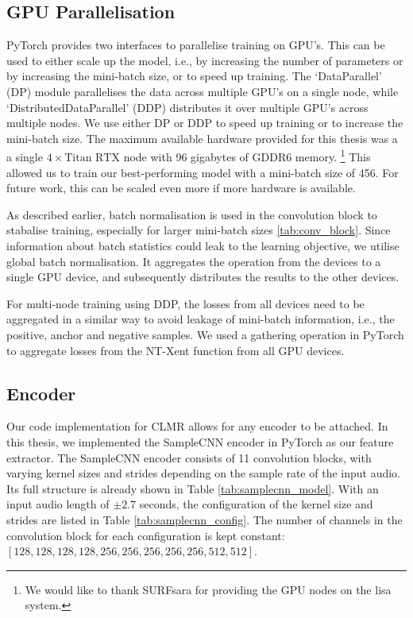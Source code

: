 \subsection{GPU Parallelisation}
PyTorch provides two interfaces to parallelise training on GPU's.
This can be used to either scale up the model, i.e., by increasing the number of parameters or by increasing the mini-batch size, or to speed up training.
The `DataParallel' (DP) module parallelises the data across multiple GPU's on a single node, while `DistributedDataParallel' (DDP) distributes it over multiple GPU's across multiple nodes.
We use either DP or DDP to speed up training or to increase the mini-batch size.
The maximum available hardware provided for this thesis was a a single $4\times \text{Titan RTX}$ node with 96 gigabytes of GDDR6 memory.
\footnote{We would like to thank SURFsara for providing the GPU nodes on the lisa system.}
This allowed us to train our best-performing model with a mini-batch size of 456. For future work, this can be scaled even more if more hardware is available.

As described earlier, batch normalisation is used in the convolution block to stabalise training, especially for larger mini-batch sizes \ref{tab:conv_block}.
Since information about batch statistics could leak to the learning objective, we utilise global batch normalisation.
It aggregates the operation from the devices to a single GPU device, and subsequently distributes the results to the other devices.

For multi-node training using DDP, the losses from all devices need to be aggregated in a similar way to avoid leakage of mini-batch information, i.e., the positive, anchor and negative samples. We used a gathering operation in PyTorch to aggregate losses from the NT-Xent function from all GPU devices.

\subsection{Encoder}
Our code implementation for CLMR allows for any encoder to be attached.
In this thesis, we implemented the SampleCNN encoder in PyTorch as our feature extractor.
The SampleCNN encoder consists of 11 convolution blocks, with varying kernel sizes and strides depending on the sample rate of the input audio. Its full structure is already shown in Table \ref{tab:samplecnn_model}.
With an input audio length of $±2.7$ seconds, the configuration of the kernel size and strides are listed in Table \ref{tab:samplecnn_config}.
The number of channels in the convolution block for each configuration is kept constant: $[128, 128, 128, 128, 256, 256, 256 , 256, 256, 512, 512]$.

